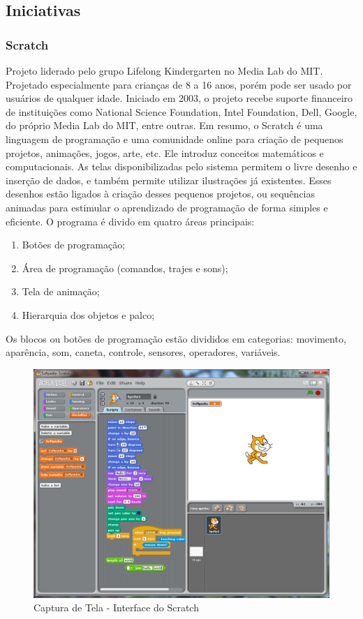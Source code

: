 \subsection{Iniciativas}

\subsubsection{Scratch}

Projeto liderado pelo grupo Lifelong Kindergarten no Media Lab do MIT. Projetado especialmente para crianças de 8 a 16 anos, porém pode ser usado por usuários de qualquer idade. Iniciado em 2003, o projeto recebe suporte financeiro de instituições como National Science Foundation, Intel Foundation, Dell, Google, do próprio Media Lab do MIT, entre outras.
Em resumo, o Scratch é uma linguagem de programação e uma comunidade online para criação de pequenos projetos, animações, jogos, arte, etc. Ele introduz conceitos matemáticos e computacionais.
As telas disponibilizadas pelo sistema permitem o livre desenho e inserção de dados, e também permite utilizar ilustrações já existentes. Esses desenhos estão ligados à criação desses pequenos projetos, ou sequências animadas para estimular o aprendizado de programação de forma simples e eficiente.
O programa é divido em quatro áreas principais:

\begin{enumerate}
  \item Botões de programação;
  \item Área de programação (comandos, trajes e sons);
  \item Tela de animação;
  \item Hierarquia dos objetos e palco;
\end{enumerate}

Os blocos ou botões de programação estão divididos em categorias: movimento, aparência, som, caneta, controle, sensores, operadores, variáveis.

\begin{figure}[ht]
\centering
\includegraphics[width=.5\textwidth]{edit/img/scratch.png}
\caption{Captura de Tela - Interface do Scratch}
\label{fig:exampleFig1}
\end{figure}

